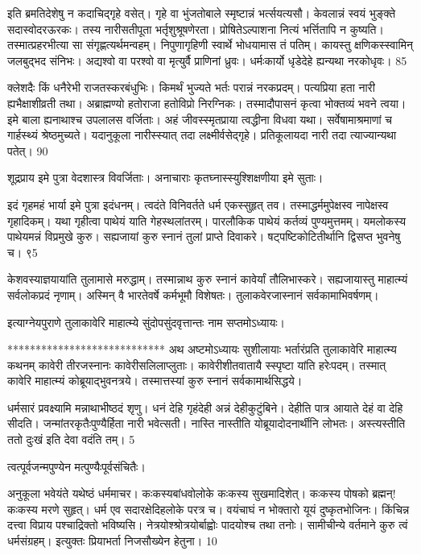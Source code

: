 इति ब्रमतिदेशेषु न कदाचिद्गृहे वसेत्।
गृहे वा भुंजतोबाले स्मृष्टान्नं भर्त्सयत्यसौ।
केवलान्नं स्वयं भुङ्क्ते सदास्वोदरऊरकः।
तस्य नारीसतीपूता भर्तृशुश्रूषणेरता।
प्रोषितेऽल्पाशना नित्यं भर्त्तितापि न कुष्यति।
तस्मात्प्रहरभीत्या सा संगृह्णत्यर्थमन्वहम्।
निपुणागृहिणी स्वार्थे भोधयामास तं पतिम्।
कायस्तु क्षणिकस्स्वामिन् जलबुद्भद संनिभः।
अद्यश्वो वा परश्वो वा मृत्युर्वै प्राणिनां ध्रुवः।
धर्मःकार्यो धृडेदेहे ह्यन्यथा नरकोधृवः।
85

क्लेशदैः किं धनैरेभी राजतस्करबंधुभिः।
किमर्थं भुज्यते भर्तः परान्नं नरकप्रदम्।
पत्यप्रिया हता नारी ह्यभैक्षाशीव्रती तथा।
अब्राह्मण्यो हतोराजा हतोविप्रो निरग्निकः।
तस्मादौपासनं कृत्वा भोक्तव्यं भवने त्वया।
इमे बाला ह्यनाथाश्च उपलालस वर्जिताः।
अहं जीवस्स्मृतप्राया त्वद्धीना विधवा यथा।
सर्वेषामाश्रमाणां च गार्हस्थ्यं श्रेष्ठमुच्यते।
यदानुकूला नारीस्स्यात् तदा लक्ष्मीर्वसेद्गृहे।
प्रतिकूलायदा नारी तदा त्याज्यान्यथा पतेत्।
90

शूद्रप्राय इमे पुत्रा वेदशास्त्र विवर्जिताः।
अनाचाराः कृतघ्नास्स्युश्शिक्षणीया इमे सुताः।

इदं गृहमहं भार्या इमे पुत्रा इदंधनम्।
त्वदंते विनिवर्तते धर्म एकस्सुहृत् तव।
तस्माद्धर्ममुपेक्षस्व नापेक्षस्व गृहादिकम्।
यथा गृहीत्वा पाथेयं याति गेहस्थलांतरम्।
पारलौकिक पाथेयं कर्तव्यं पुण्यमुत्तमम्।
यमलोकस्य पाथेयमन्नं विप्रमुखे कुरु।
सह्यजायां कुरु स्नानं तुलां प्राप्ते दिवाकरे।
षट्पष्टिकोटितीर्थानि द्विसप्त भुवनेषु च।
९5

केशवस्याज्ञयायांति तुलामासे मरुद्धाम्।
तस्मान्नाथ कुरु स्नानं कावेर्यां तौलिभास्करे।
सह्यजायास्तु माहात्म्यं सर्वलोकप्रदं नृणाम्।
अस्मिन् वै भारतेवर्षे कर्मभूमौ विशेषतः।
तुलाकवेरजास्नानं सर्वकामाभिवर्षणम्।

इत्याग्नेयपुराणे तुलाकावेरि माहात्म्ये सुंदोपसुंदवृत्तान्तः नाम सप्तमोऽध्यायः।

****************************
अथ अष्टमोऽध्यायः सुशीलायाः भर्तारंप्रति तुलाकावेरि माहात्म्य कथनम् कावेरी तीरजस्नानः कावेरीसलिलाप्लुताः।
कावेरीशीतवातायै स्स्पृष्टा यांति हरेःपदम्।
तस्मात् कावेरि माहात्म्यं कोब्रूयाद्भुवनत्रये।
तस्मात्तस्यां कुरु स्नानं सर्वकामार्थसिद्धये।

धर्मसारं प्रवक्ष्यामि मन्नाथाभीष्ठदं शृणु।
धनं देहि गृहंदेही अन्नं देहीकुटुंबिने।
देहीति पात्र आयाते देहं वा देहि सीदति।
जन्मांतरकृतैःपुण्यैर्हिता नारी भवेत्सती।
नास्ति नास्तीति योब्रूयादोदनार्थीनि लोभतः।
अस्त्यस्तीति ततो दुःखं इति देवा वदंति तम्।
5

त्वत्पूर्वजन्मपुण्येन मत्पुण्यैःपूर्वसंचितैः।

अनुकूला भवेयंते यथेष्ठं धर्ममाचर।
कःकस्यबांधवोलोके कःकस्य सुखमादिशेत्।
कःकस्य पोषको ब्रह्मन्! कःकस्य मरणे सुहृत्।
धर्म एव सदारक्षेदिहलोके परत्र च।
वयंचाघं न भोक्तारो यूयं दुष्कृतभोजिनः।
किंचिन्न दत्त्वा विप्राय पश्चाद्रिक्तो भविष्यसि।
नेत्रयोश्श्रोत्रयोर्बाह्वोः पादयोश्च तथा तनोः।
सामीचीन्ये वर्तमाने कुरु त्वं धर्मसंग्रहम्।
इत्युक्तः प्रियाभर्ता निजसौख्येन हेतुना।
10

